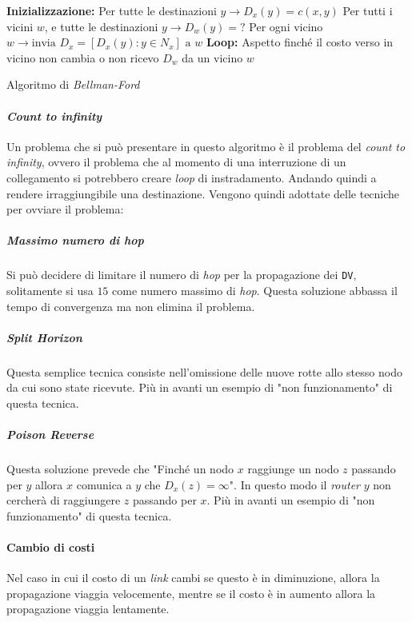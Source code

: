             \begin{algorithm}[H]
                \SetAlgoLined
                \textbf{Inizializzazione:}\;
                Per tutte le destinazioni $y \rightarrow D_x(y) = c(x,y)$\;
                Per tutti i vicini $w$, e tutte le destinazioni $y \rightarrow D_w(y) = ?$\;
                Per ogni vicino $w \rightarrow \text{invia } D_x = [D_x(y):y\in N_x] \text{ a } w$\;
                \textbf{Loop:}\;
                Aspetto finché il costo verso in vicino non cambia o non ricevo $D_w$ da un vicino $w$\;
                \caption{Algoritmo di \textit{Bellman-Ford}}
            \end{algorithm}
        \paragraph{\textit{Count to infinity}} Un problema che si può presentare in questo algoritmo è il problema del \textit{count to infinity}, ovvero il problema che al momento di una interruzione di un collegamento si potrebbero creare \textit{loop} di instradamento. Andando quindi a rendere irraggiungibile una destinazione. Vengono quindi adottate delle tecniche per ovviare il problema:
            \subparagraph{Massimo numero di \textit{hop}} Si può decidere di limitare il numero di \textit{hop} per la propagazione dei \texttt{DV}, solitamente si usa $15$ come numero massimo di \textit{hop}. Questa soluzione abbassa il tempo di convergenza ma non elimina il problema.
            \subparagraph{\textit{Split Horizon}} Questa semplice tecnica consiste nell'omissione delle nuove rotte allo stesso nodo da cui sono state ricevute. Più in avanti un esempio di "non funzionamento" di questa tecnica.
            \subparagraph{\textit{Poison Reverse}} Questa soluzione prevede che "Finché un nodo $x$ raggiunge un nodo $z$ passando per $y$ allora $x$ comunica a $y$ che $D_x(z)=\infty$". In questo modo il \textit{router} $y$ non cercherà di raggiungere $z$ passando per $x$. Più in avanti un esempio di "non funzionamento" di questa tecnica.
        \paragraph{Cambio di costi} Nel caso in cui il costo di un \textit{link} cambi se questo è in diminuzione, allora la propagazione viaggia velocemente, mentre se il costo è in aumento allora la propagazione viaggia lentamente.
